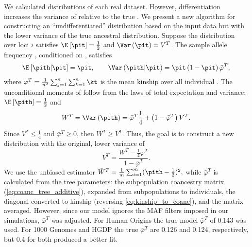 \documentclass[11pt]{article}
\begin{document}
We calculated \pith distributions of each real dataset.
However, differentiation increases the variance of \pith relative to the true \pit \citep{ochoa_estimating_2021}.
We present a new algorithm for constructing an ``undifferentiated'' distribution based on the input data but with the lower variance of the true ancestral distribution.
Suppose the \pit distribution over loci $i$ satisfies $\E \left[ \pit \right] = \frac{1}{2}$ and $\Var \left( \pit \right) = V^T$.
The sample allele frequency \pith, conditioned on \pit, satisfies
$$
\E \left[ \pith \middle| \pit \right]
=
\pit
, \quad\quad
\Var \left( \pith \middle| \pit \right)
=
\pit \left( 1 - \pit \right) \bar{\varphi}^T
,
$$
where $\bar{\varphi}^T = \frac{1}{n^2} \sum_{j=1}^n \sum_{k=1}^n \kt$ is the mean kinship over all individual \citep{ochoa_estimating_2021}.
The unconditional moments of \pith follow from the laws of total expectation and variance: 
$
\E \left[ \pith \right]
=
\frac{1}{2}
$
and
\begin{equation*}
  W^T
  =
  \Var \left( \pith \right)
  =
  \bar{\varphi}^T \frac{1}{4}
  + \left( 1 - \bar{\varphi}^T \right) V^T
  .
\end{equation*}
Since $V^T \le \frac{1}{4}$ and $\bar{\varphi}^T \ge 0$, then $W^T \ge V^T$.
Thus, the goal is to construct a new distribution with the original, lower variance of
\begin{equation}
  \label{eq:var_undiff}
  V^T
  =
  \frac{ W^T - \frac{1}{4} \bar{\varphi}^T }{ 1 - \bar{\varphi}^T }
  .
\end{equation}
We use the unbiased estimator
$
\hat{W}^T
=
\frac{1}{m} \sum_{i=1}^m ( \pith - \frac{1}{2})^2
,
$
while $\bar{\varphi}^T$ is calculated from the tree parameters: the subpopulation coancestry matrix (\cref{eq:coanc_tree_additive}), expanded from subpopulations to individuals, the diagonal converted to kinship (reversing \cref{eq:kinship_to_coanc}), and the matrix averaged.
However, since our model ignores the MAF filters imposed in our simulations, $\bar{\varphi}^T$ was adjusted.
For Human Origins the true model $\bar{\varphi}^T$ of 0.143 was used.
For 1000 Genomes and HGDP the true $\bar{\varphi}^T$ are 0.126 and 0.124, respectively, but 0.4 for both produced a better fit.
\end{document}
